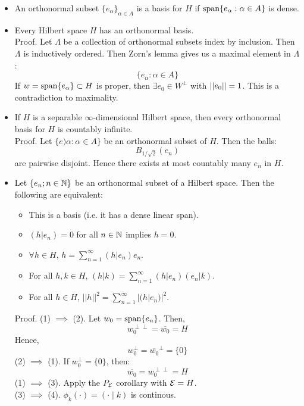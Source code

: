 \documentclass[12pt]{article}
\begin{document}
\begin{itemize}
    Then, for all $h \in H$, 
    \[ \sum_{n=1}^\infty (h\mid e_n)e_n\]
    converges in $H$ and: 
    \[ P_\EE (h) = \sum_{n=1}^\infty (h\mid e_n)e_n\]
    Proof. Pictures. 
    \item[Defn.] An orthonormal subset $\{e_\alpha\}_{\alpha \in A}$ is a basis for $H$ if $\operatorname{span}\{e_\alpha : \alpha \in A\}$ is dense. 
    \item[Prop.] Every Hilbert space $H$ has an orthonormal basis. \\
    Proof. Let $\Lambda$ be a collection of orthonormal subsets index by inclusion. Then $\Lambda$ is inductively ordered. Then Zorn's lemma gives us a maximal element in $\Lambda$: 
    \[ \{e_\alpha : \alpha \in A\}\]
    If $w = \operatorname{span}\{e_\alpha\} \subset H$ is proper, then $\exists e_0 \in W^\perp$ with $\left\vert\left\vert e_0\right\vert\right\vert = 1$. This is a contradiction to maximality. 
    \item[Corr.] If $H$ is a separable $\infty$-dimensional Hilbert space, then every orthonormal basis for $H$ is countably infinite. \\
    Proof. Let $\{e)\alpha : \alpha \in A\}$ be an orthonormal subset of $H$. Then the balls: 
    \[ B_{1/\sqrt2}(e_n)\]
    are pairwise disjoint. Hence there exists at most countably many $e_n$ in $H$.
    \item[Thm.] Let $\{e_n ; n \in \mathbb N\}$ be an orthonormal subset of a Hilbert space. Then the following are equivalent:
    \begin{itemize}
        \item This is a basis (i.e. it has a dense linear span).
        \item $(h|e_n) = 0$ for all $n \in \mathbb N$ implies $h = 0$.
        \item $\forall h \in H$, $h = \sum_{n=1}^\infty (h|e_n)e_n$.
        \item For all $h, k \in H$, $(h|k) = \sum_{n=1}^\infty (h|e_n)(e_n|k)$.
        \item For all $h \in H$, $||h||^2 = \sum_{n=1}^\infty |(h|e_n)|^2$.
    \end{itemize}
    Proof. (1) $\implies$ (2). Let $w_0 = \operatorname{span}\{e_n\}$. Then, 
    \[ w_0^{\perp\perp} = \overline{w_0} = H \]
    Hence, 
    \[ w_0^\perp = \overline{w_0}^\perp = \{0\}\]
    (2) $\implies$ (1). If $w_0^\perp = \{0\}$, then: 
    \[ \overline{w_0} = w_0^{\perp\perp} = H\]
    (1) $\implies$ (3). Apply the $P_{\mathcal{E}}$ corollary with $\mathcal{E} = H$. \\
    (3) $\implies$ (4). $\phi_k(\cdot) = (\cdot \mid k)$ is continous. \\

\end{itemize}
\end{document}
